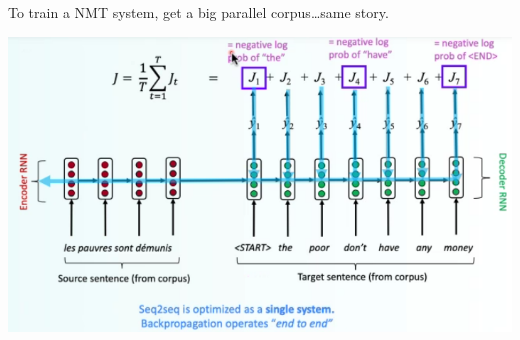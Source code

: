 \documentclass[10pt]{report}
\begin{document}
To train a NMT system, get a big parallel corpus\ldots same story.
\begin{center}
	\includegraphics[scale=0.6]{64.png}
\end{center}
\end{document}
